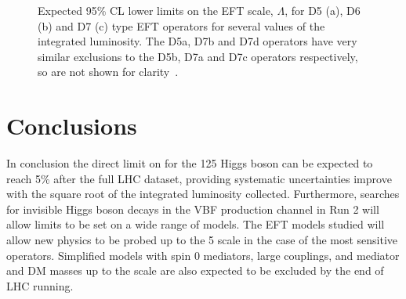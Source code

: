 \begin{figure}
  \caption{Expected 95\% CL lower limits on the EFT scale, $\Lambda$, for D5 (a), D6 (b) and D7 (c) type EFT operators for several values of the integrated luminosity. The D5a, D7b and D7d operators have very similar exclusions to the D5b, D7a and D7c operators respectively, so are not shown for clarity~\cite{ourdmpaper}.}
  \label{fig:eftlimits}
\end{figure}

\section{Conclusions}
\label{sec:dmconclusions}
In conclusion the direct limit on \BRinv for the 125 \GeV Higgs boson can be expected to reach 5\% after the full LHC dataset, providing systematic uncertainties improve with the square root of the integrated luminosity collected. Furthermore, searches for invisible Higgs boson decays in the \ac{VBF} production channel in Run 2 will allow limits to be set on a wide range of models. The \ac{EFT} models studied will allow new physics to be probed up to the 5 \TeV scale in the case of the most sensitive operators. Simplified models with spin 0 mediators, large couplings, and mediator and \ac{DM} masses  up to the \TeV scale are also expected to be excluded by the end of LHC running.

